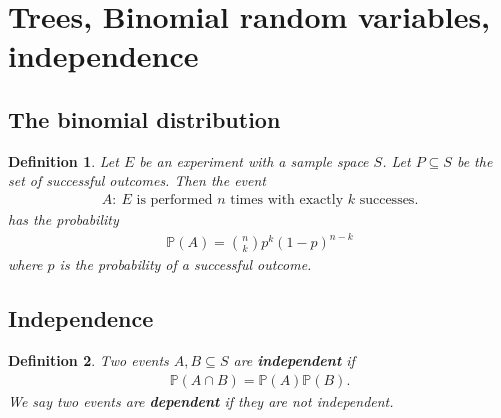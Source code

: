 \documentclass{article}
\theoremstyle{sltheorem}
\newtheorem{definition}{Definition}[section]
\renewcommand{\P}{\mathbb{P}}
\newcommand*\B[1]{\textbf{#1}}
\begin{document}
\section{Trees, Binomial random variables, independence}
\subsection{The binomial distribution}
\begin{definition}
    Let $E$ be an experiment with a sample space $S$.
    Let $P\subseteq S$ be the set of successful outcomes.
    Then the event
    \begin{align*}
        A:\:\text{$E$ is performed $n$ times with exactly $k$ successes.}
    \end{align*}
    has the probability
    \begin{align*}
        \P(A) = \binom{n}{k}p^k (1-p)^{n-k}
    \end{align*}
    where $p$ is the probability of a successful outcome.
\end{definition}
\subsection{Independence}
\begin{definition}
    Two events $A,B\subseteq S$ are \B{independent} if
    \begin{align*}
        \P(A\cap B) = \P(A)\P(B).
    \end{align*}
    We say two events are \B{dependent} if they are not independent.
\end{definition}
\end{document}
